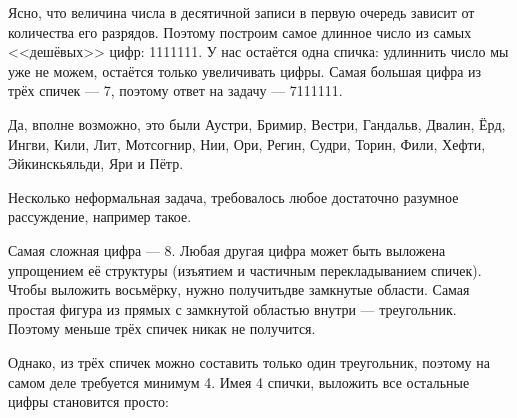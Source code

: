 \begin{itemize}
\itA Ясно, что величина числа в десятичной записи в первую очередь зависит от 
количества его разрядов. Поэтому построим самое длинное число из самых
<<дешёвых>> цифр: 1111111. У нас остаётся одна спичка: удлиннить число мы
уже не можем, остаётся только увеличивать цифры. Самая большая цифра из трёх
спичек --- 7, поэтому ответ на задачу --- 7111111.

\itB Да, вполне возможно, это были 
Аустри, Бримир, Вестри, Гандальв, Двалин, 
Ёрд, Ингви, Кили, Лит, Мотсогнир, 
Нии, Ори, Регин, Судри, Торин,
Фили, Хефти, Эйкинскьяльди, Яри
и Пётр.
                                                        
\itC Несколько неформальная задача, требовалось любое достаточно\linebreak
разумное рассуждение, например такое.

Самая сложная цифра --- 8. Любая другая цифра может быть выложена
упрощением её структуры (изъятием и частичным перекладыванием спичек).
Чтобы выложить восьмёрку, нужно получить\linebreak две замкнутые области.
Самая простая фигура из прямых с замкнутой областью внутри --- треугольник.
Поэтому меньше трёх спичек никак не получится.

Однако, из трёх спичек можно составить только один треугольник, поэтому
на самом деле требуется минимум 4. Имея 4 спички, выложить все
остальные цифры становится просто: \medskip

\begin{center} \end{center}

\end{itemize}
